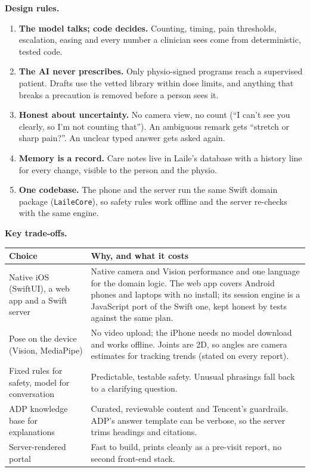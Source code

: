 \documentclass[11pt,a4paper]{article}
\begin{document}
\textbf{Design rules.}
\begin{enumerate}[leftmargin=1.4em]
  \item \textbf{The model talks; code decides.} Counting, timing, pain thresholds, escalation, easing and every number a clinician sees come from deterministic, tested code.
  \item \textbf{The AI never prescribes.} Only physio-signed programs reach a supervised patient. Drafts use the vetted library within dose limits, and anything that breaks a precaution is removed before a person sees it.
  \item \textbf{Honest about uncertainty.} No camera view, no count (``I can't see you clearly, so I'm not counting that''). An ambiguous remark gets ``stretch or sharp pain?''. An unclear typed answer gets asked again.
  \item \textbf{Memory is a record.} Care notes live in Laile's database with a history line for every change, visible to the person and the physio.
  \item \textbf{One codebase.} The phone and the server run the same Swift domain package (\texttt{LaileCore}), so safety rules work offline and the server re-checks with the same engine.
\end{enumerate}

\textbf{Key trade-offs.}

\begin{tabularx}{\linewidth}{@{}L{4.2cm}Y@{}}
\toprule
\textbf{Choice} & \textbf{Why, and what it costs}\\
\midrule
Native iOS (SwiftUI), a web app and a Swift server & Native camera and Vision performance and one language for the domain logic. The web app covers Android phones and laptops with no install; its session engine is a JavaScript port of the Swift one, kept honest by tests against the same plan.\\
Pose on the device (Vision, MediaPipe) & No video upload; the iPhone needs no model download and works offline. Joints are 2D, so angles are camera estimates for tracking trends (stated on every report).\\
Fixed rules for safety, model for conversation & Predictable, testable safety. Unusual phrasings fall back to a clarifying question.\\
ADP knowledge base for explanations & Curated, reviewable content and Tencent's guardrails. ADP's answer template can be verbose, so the server trims headings and citations.\\
Server-rendered portal & Fast to build, prints cleanly as a pre-visit report, no second front-end stack.\\
\bottomrule
\end{tabularx}
\end{document}
